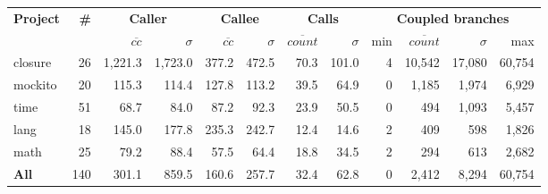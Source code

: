 
\begin{tabular}{ l r | rr | rr | rr | rrrr }
\hline 
\textbf{Project} & \textbf{\#} & \multicolumn{2}{c}{\textbf{Caller}} & \multicolumn{2}{c}{\textbf{Callee}} & \multicolumn{2}{c}{\textbf{Calls}} & \multicolumn{4}{c}{\textbf{Coupled branches}} \\ 
 &  & $\overline{cc}$ & $\sigma$ & $\overline{cc}$ & $\sigma$ & $\overline{count}$ & $\sigma$ & min & $\overline{count}$ & $\sigma$ & max \\  
\hline 
closure & 26 & 1,221.3 & 1,723.0 & 377.2 & 472.5 & 70.3 & 101.0 & 4 & 10,542 & 17,080 & 60,754 \\ 
mockito & 20 & 115.3 & 114.4 & 127.8 & 113.2 & 39.5 & 64.9 & 0 & 1,185 & 1,974 & 6,929 \\ 
time & 51 & 68.7 & 84.0 & 87.2 & 92.3 & 23.9 & 50.5 & 0 & 494 & 1,093 & 5,457 \\ 
lang & 18 & 145.0 & 177.8 & 235.3 & 242.7 & 12.4 & 14.6 & 2 & 409 & 598 & 1,826 \\ 
math & 25 & 79.2 & 88.4 & 57.5 & 64.4 & 18.8 & 34.5 & 2 & 294 & 613 & 2,682 \\ 
\hline 
\textbf{All} & 140 & 301.1 & 859.5 & 160.6 & 257.7 & 32.4 & 62.8 & 0 & 2,412 & 8,294 & 60,754 \\ 
\hline 
\end{tabular}
 